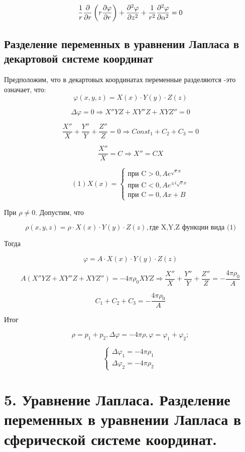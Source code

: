 \documentclass[a4paper,12pt]{article}
\newcommand{\fc}[1]{\[#1\]}
\begin{document}
\fc{{\displaystyle {1 \over r}{\partial  \over \partial r}\left(r{\partial \varphi \over \partial r}\right)+{\partial ^{2}\varphi \over \partial z^{2}}+{1 \over r^{2}}{\partial ^{2}\varphi \over \partial \alpha ^{2}}=0}}

\subsection*{Разделение переменных в уравнении Лапласа в
декартовой системе координат}

Предположим, что в декартовых координатах переменные разделяются -это означает, что: 
\fc{\varphi(x,y,z)=X(x)\cdot Y(y)\cdot Z(z)}

\fc{\Delta \varphi=0 \Rightarrow X''YZ+XY''Z+XYZ''=0}

\newpage


\fc{\frac{X''}{X}+\frac{Y''}{Y}+\frac{Z''}{Z}=0 \Rightarrow Const_1+C_2+C_3=0}

\fc{\frac{X''}{X}=C \Rightarrow X''=CX}

\fc{(1)X(x)=
\left\{
\begin{aligned}
\text{при C} >0 ,Ae^{\sqrt{c}x} \\
\text{при C} <0 ,Ae^{\pm i\sqrt{c}x} \\
\text{при C} =0 ,Ax+B
\end{aligned}
\right.}

При $\rho \neq0$. Допустим, что 

\fc{\rho(x,y,z)=\rho \cdot X(x)\cdot Y(y)\cdot Z(z),\text{где X,Y,Z функции вида (1)}}

Тогда 

\fc{\varphi=A\cdot X(x)\cdot Y(y)\cdot Z(z)}

\fc{A(X''YZ+XY''Z+XYZ'')=-4\pi \rho_0 XYZ\Rightarrow \frac{X''}{X}+\frac{Y''}{Y}+\frac{Z''}{Z}=-\frac{4\pi \rho_0}{A}}

\fc{C_1+C_2+C_3=-\frac{4\pi \rho_0}{A}}

Итог

\fc{\rho = p _ { 1 } + p _ { 2 } , \Delta \varphi = - 4 \pi \rho , \varphi = \varphi _ { 1 } + \varphi _ { 2 } ;}

\fc{
\left\{
\begin{aligned}
\Delta \varphi_1=-4\pi \rho_1 \\
\Delta \varphi_2=-4\pi \rho_2  \
\end{aligned}
\right.}



\newpage


\section*{5. Уравнение Лапласа. Разделение переменных в уравнении Лапласа в
сферической системе координат.}
\end{document}
